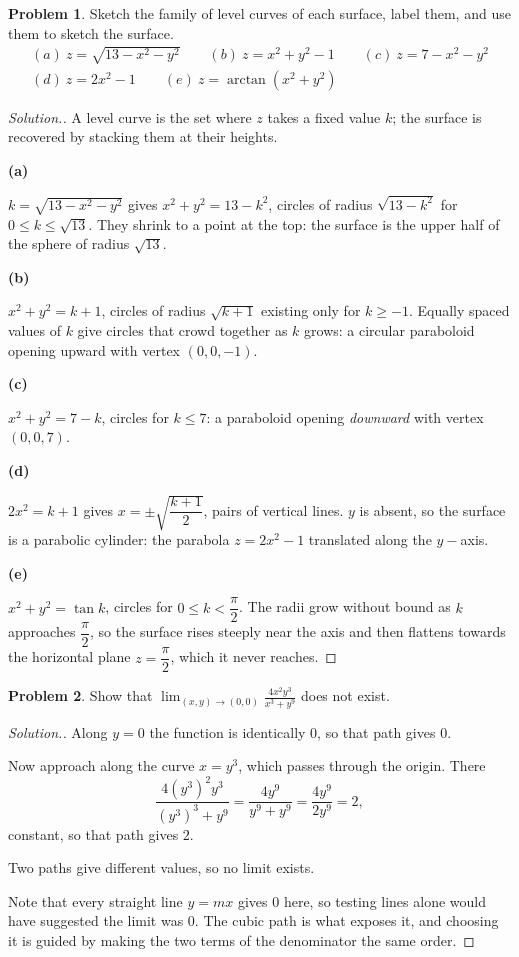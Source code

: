 \documentclass[11pt,a4paper]{article}
\theoremstyle{definition}
\newtheorem{problemx}{Problem}[subsection]
\newenvironment{problem}{\begin{problemx}}{\end{problemx}}
\newenvironment{solution}
  {\renewcommand{\qedsymbol}{}\begin{proof}[\textit{Solution}.]}
  {\end{proof}}
\newcommand{\subhead}[1]{%
  \par\medskip\noindent\textbf{#1}\par\nobreak\smallskip}
\begin{document}
\begin{problem}
Sketch the family of level curves of each surface, label them, and use them to
sketch the surface.
\begin{gather*}
(a)\ z = \sqrt{13-x^2-y^2}\qquad (b)\ z = x^2+y^2-1\qquad (c)\ z = 7-x^2-y^2\\
(d)\ z = 2x^2-1\qquad (e)\ z = \arctan(x^2+y^2)
\end{gather*}
\end{problem}
\begin{solution}
A level curve is the set where $z$ takes a fixed value $k$; the surface is
recovered by stacking them at their heights.

\subhead{(a)}
$k = \sqrt{13-x^2-y^2}$ gives $x^2+y^2 = 13-k^2$, circles of radius
$\sqrt{13-k^2}$ for $0\leq k\leq\sqrt{13}$. They shrink to a point at the top:
the surface is the upper half of the sphere of radius $\sqrt{13}$.

\subhead{(b)}
$x^2+y^2 = k+1$, circles of radius $\sqrt{k+1}$ existing only for $k\geq -1$.
Equally spaced values of $k$ give circles that crowd together as $k$ grows: a
circular paraboloid opening upward with vertex $(0,0,-1)$.

\subhead{(c)}
$x^2+y^2 = 7-k$, circles for $k\leq 7$: a paraboloid opening \emph{downward}
with vertex $(0,0,7)$.

\subhead{(d)}
$2x^2 = k+1$ gives $x = \pm\sqrt{\dfrac{k+1}{2}}$, pairs of vertical lines. $y$
is absent, so the surface is a parabolic cylinder: the parabola $z = 2x^2-1$
translated along the $y-$axis.

\subhead{(e)}
$x^2+y^2 = \tan k$, circles for $0\leq k<\dfrac{\pi}{2}$. The radii grow without
bound as $k$ approaches $\dfrac{\pi}{2}$, so the surface rises steeply near the
axis and then flattens towards the horizontal plane $z = \dfrac{\pi}{2}$, which
it never reaches.
\end{solution}

\begin{problem}
Show that $\displaystyle{\lim_{(x,y)\rightarrow(0,0)}\frac{4x^2y^3}{x^3+y^9}}$
does not exist.
\end{problem}
\begin{solution}
Along $y=0$ the function is identically $0$, so that path gives $0$.

Now approach along the curve $x = y^3$, which passes through the origin. There
\[\frac{4(y^3)^2y^3}{(y^3)^3+y^9}
= \frac{4y^9}{y^9+y^9} = \frac{4y^9}{2y^9} = 2 ,\]
constant, so that path gives $2$.

Two paths give different values, so no limit exists.

Note that every straight line $y = mx$ gives $0$ here, so testing lines alone
would have suggested the limit was $0$. The cubic path is what exposes it, and
choosing it is guided by making the two terms of the denominator the same order.
\end{solution}
\end{document}
